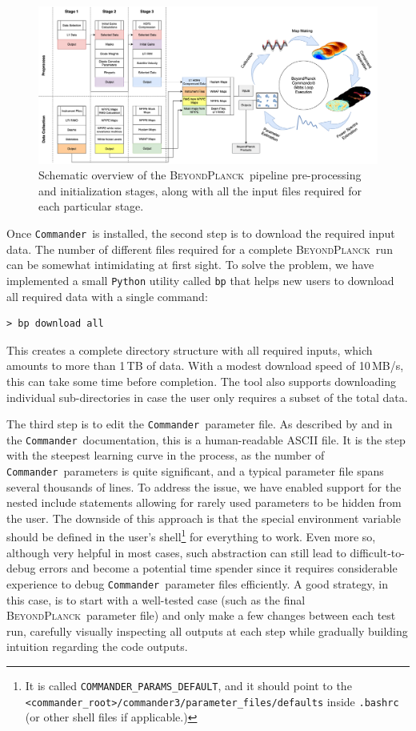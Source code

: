 \documentclass[twocolumn]{openjournal}
\def\commander{\texttt{Commander}}
\newcommand{\BP}{\textsc{BeyondPlanck}}
\begin{document}
\begin{figure}
      \center
      \includegraphics[width=18.5cm]{figures/bp_pipeline_reworked_v3.png}
      \caption{Schematic overview of the \BP\ pipeline pre-processing
        and initialization stages, along with all the input files
        required for each particular stage.}\label{fig:bp_pipeline_stages}
\end{figure}

Once \commander\ is installed, the second step is to download the required
input data. The number of different files required for a complete \BP\ run can
be somewhat intimidating at first sight. To solve the problem, we have
implemented a small \texttt{Python} utility called \texttt{bp} that helps new
users to download all required data with a single command:

\begin{verbatim}
> bp download all
\end{verbatim}
\noindent This creates a complete directory structure with all required inputs,
which amounts to more than 1\,TB of data. With a modest download speed of
10\,MB/s, this can take some time before completion. The tool also supports
downloading individual sub-directories in case the user only requires a subset
of the total data.

The third step is to edit the \commander\ parameter file. As described by
\citet{bp03} and in the \commander\ documentation, this is a human-readable
ASCII file. It is the step with the steepest learning curve in the process, as
the number of \commander\ parameters is quite significant, and a typical
parameter file spans several thousands of lines. To address the issue, we have
enabled support for the nested include statements allowing for rarely used
parameters to be hidden from the user. The downside of this approach is that
the special environment variable should be defined in the user’s
shell\footnote{It is called \texttt{COMMANDER\_PARAMS\_DEFAULT}, and it should
point to the \texttt{<commander\_root>/commander3/parameter\_files/defaults}
inside \texttt{.bashrc} (or other shell files if applicable.)} for everything
to work. Even more so, although very helpful in most cases, such abstraction
can still lead to difficult-to-debug errors and become a potential time spender
since it requires considerable experience to debug \commander\ parameter files
efficiently. A good strategy, in this case, is to start with a well-tested case
(such as the final \BP\ parameter file) and only make a few changes between
each test run, carefully visually inspecting all outputs at each step while
gradually building intuition regarding the code outputs.
\end{document}
